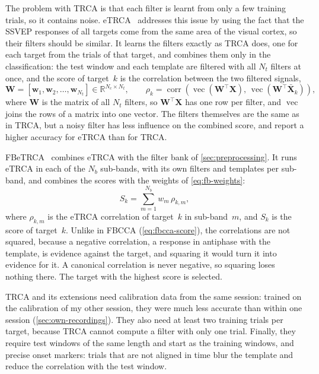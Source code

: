 The problem with \ac{TRCA} is that each filter is learnt from only a few training trials, so
it contains noise. \ac{eTRCA}~\citep{nakanishi2018trca} addresses this issue by using the fact
that the \ac{SSVEP} responses of all targets come from the same area of the visual cortex, so
their filters should be similar. It learns the filters exactly as \ac{TRCA} does, one for each
target from the trials of that target, and combines them only in the classification: the test
window and each template are filtered with all $N_t$ filters at once, and the score of
target~$k$ is the correlation between the two filtered signals,
\begin{equation}
    \mathbf{W} = \left[\mathbf{w}_1, \mathbf{w}_2, \dots, \mathbf{w}_{N_t}\right]
    \in \mathbb{R}^{N_c \times N_t},
    \qquad
    \rho_k = \operatorname{corr}\left(\operatorname{vec}(\mathbf{W}^\top \mathbf{X}),\,
                                      \operatorname{vec}(\mathbf{W}^\top \bar{\mathbf{X}}_k)\right),
    \label{eq:etrca-score}
\end{equation}
where $\mathbf{W}$ is the matrix of all $N_t$ filters, so $\mathbf{W}^\top \mathbf{X}$ has one
row per filter, and $\operatorname{vec}$ joins the rows of a matrix into one vector. The
filters themselves are the same as in \ac{TRCA}, but a noisy filter has less influence on the
combined score, and \citet{nakanishi2018trca} report a higher accuracy for \ac{eTRCA} than for
\ac{TRCA}.

\ac{FBeTRCA}~\citep{nakanishi2018trca} combines \ac{eTRCA} with the filter bank of
\cref{sec:preprocessing}. It runs \ac{eTRCA} in each of the $N_b$ sub-bands, with its own
filters and templates per sub-band, and combines the scores with the weights of
\cref{eq:fb-weights}:
\begin{equation}
    S_k = \sum_{m=1}^{N_b} w_m \, \rho_{k,m},
    \label{eq:fbetrca-score}
\end{equation}
where $\rho_{k,m}$ is the \ac{eTRCA} correlation of target~$k$ in sub-band~$m$, and $S_k$ is
the score of target~$k$. Unlike in \ac{FBCCA} (\cref{eq:fbcca-score}), the correlations are
not squared, because a negative correlation, a response in antiphase with the template, is
evidence against the target, and squaring it would turn it into evidence for it. A canonical
correlation is never negative, so squaring loses nothing there. The target with the highest
score is selected.

\ac{TRCA} and its extensions need calibration data from the same session: trained on the
calibration of my other session, they were much less accurate than within one session
(\cref{sec:own-recordings}). They also need at least two training
trials per target, because \ac{TRCA} cannot compute a filter with only one trial. Finally, 
they require test windows of the same length and start as the training windows, and precise onset 
markers: trials that are not aligned in time blur the template and reduce the correlation with the test window.

